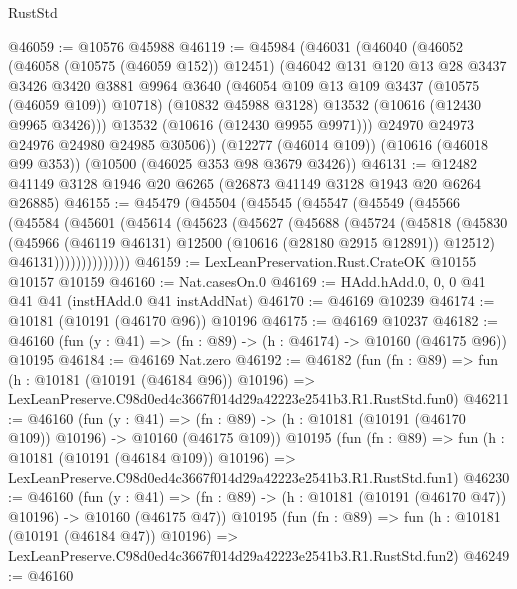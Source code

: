 \begin{lexlean}{RustStd}
\begin{coremodule}
@46059 := @10576 @45988
@46119 := @45984
    (@46031
      (@46040
        (@46052
          (@46058 (@10575 (@46059 @152)) @12451)
          (@46042
            @131
            @120
            @13
            @28
            @3437
            @3426
            @3420
            @3881
            @9964
            @3640
            (@46054 @109 @13 @109 @3437 (@10575 (@46059 @109)) @10718)
            (@10832 @45988 @3128)
            @13532
            (@10616 (@12430 @9965 @3426)))
          @13532
          (@10616 (@12430 @9955 @9971)))
        @24970
        @24973
        @24976
        @24980
        @24985
        @30506))
    (@12277 (@46014 @109))
    (@10616 (@46018 @99 @353))
    (@10500 (@46025 @353 @98 @3679 @3426))
@46131 := @12482 @41149 @3128 @1946 @20 @6265 (@26873 @41149 @3128 @1943 @20 @6264 @26885)
@46155 := @45479
    (@45504
      (@45545
        (@45547
          (@45549
            (@45566
              (@45584
                (@45601
                  (@45614
                    (@45623
                      (@45627
                        (@45688
                          (@45724
                            (@45818
                              (@45830
                                (@45966
                                  (@46119 @46131)
                                  @12500
                                  (@10616 (@28180 @2915 @12891))
                                  @12512)
                                @46131))))))))))))))
@46159 := LexLeanPreservation.Rust.CrateOK @10155 @10157 @10159
@46160 := Nat.casesOn.{0}
@46169 := HAdd.hAdd.{0, 0, 0} @41 @41 @41 (instHAdd.{0} @41 instAddNat)
@46170 := @46169 @10239
@46174 := @10181 (@10191 (@46170 @96)) @10196
@46175 := @46169 @10237
@46182 := @46160 (fun (y : @41) => (fn : @89) -> (h : @46174) -> @10160 (@46175 @96)) @10195
@46184 := @46169 Nat.zero
@46192 := @46182
    (fun (fn : @89) =>
    fun (h : @10181 (@10191 (@46184 @96)) @10196) =>
    LexLeanPreserve.C98d0ed4c3667f014d29a42223e2541b3.R1.RustStd.fun0)
@46211 := @46160
    (fun (y : @41) =>
    (fn : @89) -> (h : @10181 (@10191 (@46170 @109)) @10196) -> @10160 (@46175 @109))
    @10195
    (fun (fn : @89) =>
    fun (h : @10181 (@10191 (@46184 @109)) @10196) =>
    LexLeanPreserve.C98d0ed4c3667f014d29a42223e2541b3.R1.RustStd.fun1)
@46230 := @46160
    (fun (y : @41) =>
    (fn : @89) -> (h : @10181 (@10191 (@46170 @47)) @10196) -> @10160 (@46175 @47))
    @10195
    (fun (fn : @89) =>
    fun (h : @10181 (@10191 (@46184 @47)) @10196) =>
    LexLeanPreserve.C98d0ed4c3667f014d29a42223e2541b3.R1.RustStd.fun2)
@46249 := @46160

\end{coremodule}
\end{lexlean}

